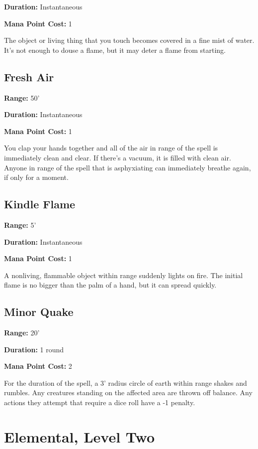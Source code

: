 \begin{multicols}{2}
\textbf{Duration:} Instantaneous

\textbf{Mana Point Cost:} 1

The object or living thing that you touch becomes covered in a fine
mist of water. It's not enough to douse a flame, but it may deter
a flame from starting.

\subsection{Fresh Air}

\textbf{Range:} 50'

\textbf{Duration:} Instantaneous

\textbf{Mana Point Cost:} 1

You clap your hands together and all of the air in range of the spell
is immediately clean and clear. If there's a vacuum, it is filled
with clean air. Anyone in range of the spell that is asphyxiating
can immediately breathe again, if only for a moment.

\subsection{Kindle Flame}

\textbf{Range:} 5'

\textbf{Duration:} Instantaneous

\textbf{Mana Point Cost:} 1

A nonliving, flammable object within range suddenly lights on fire.
The initial flame is no bigger than the palm of a hand, but it can
spread quickly.

\subsection{Minor Quake}

\textbf{Range:} 20'

\textbf{Duration:} 1 round

\textbf{Mana Point Cost:} 2

For the duration of the spell, a 3' radius circle of earth within
range shakes and rumbles. Any creatures standing on the affected
area are thrown off balance. Any actions they attempt that require
a dice roll have a -1 penalty.

\section{Elemental, Level Two}


\end{multicols}
